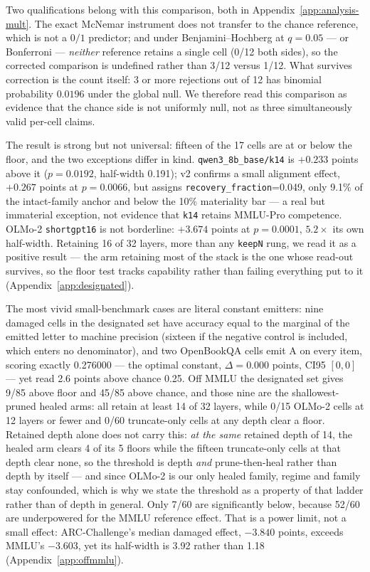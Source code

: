 Two qualifications belong with this comparison, both in Appendix~\ref{app:analysis-mult}. The exact McNemar instrument does not transfer to the chance reference, which is not a $0/1$ predictor; and under Benjamini--Hochberg at $q=0.05$ --- or Bonferroni --- \emph{neither} reference retains a single cell (0/12 both sides), so the corrected comparison is undefined rather than 3/12 versus 1/12. What survives correction is the count itself: 3 or more rejections out of 12 has binomial probability $0.0196$ under the global null. We therefore read this comparison as evidence that the chance side is not uniformly null, not as three simultaneously valid per-cell claims.

The result is strong but not universal: fifteen of the 17 cells are at or below the floor, and the two exceptions differ in kind. \texttt{qwen3\_8b\_base/k14} is $+0.233$ points above it ($p=0.0192$, half-width 0.191); v2 confirms a small alignment effect, $+0.267$ points at $p=0.0066$, but assigns \texttt{recovery\_fraction}=0.049, only 9.1\% of the intact-family anchor and below the 10\% materiality bar --- a real but immaterial exception, not evidence that \texttt{k14} retains MMLU-Pro competence. OLMo-2 \texttt{shortgpt16} is not borderline: $+3.674$ points at $p=0.0001$, $5.2\times$ its own half-width. Retaining 16 of 32 layers, more than any \texttt{keepN} rung, we read it as a positive result --- the arm retaining most of the stack is the one whose read-out survives, so the floor test tracks capability rather than failing everything put to it (Appendix~\ref{app:designated}).

The most vivid small-benchmark cases are literal constant emitters: nine damaged cells in the designated set have accuracy equal to the marginal of the emitted letter to machine precision (sixteen if the negative control is included, which enters no denominator), and two OpenBookQA cells emit A on every item, scoring exactly 0.276000 --- the optimal constant, $\Delta=0.000$ points, CI95 $[0,0]$ --- yet read 2.6 points above chance 0.25. Off MMLU the designated set gives 9/85 above floor and 45/85 above chance, and those nine are the shallowest-pruned healed arms: all retain at least 14 of 32 layers, while 0/15 OLMo-2 cells at 12 layers or fewer and 0/60 truncate-only cells at any depth clear a floor. Retained depth alone does not carry this: \emph{at the same} retained depth of 14, the healed arm clears 4 of its 5 floors while the fifteen truncate-only cells at that depth clear none, so the threshold is depth \emph{and} prune-then-heal rather than depth by itself --- and since OLMo-2 is our only healed family, regime and family stay confounded, which is why we state the threshold as a property of that ladder rather than of depth in general. Only 7/60 are significantly below, because 52/60 are underpowered for the MMLU reference effect. That is a power limit, not a small effect: ARC-Challenge's median damaged effect, $-3.840$ points, exceeds MMLU's $-3.603$, yet its half-width is 3.92 rather than 1.18 (Appendix~\ref{app:offmmlu}).


